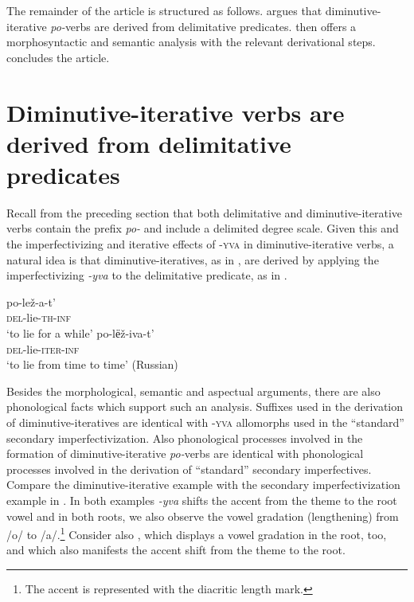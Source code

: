 \documentclass[output=paper,colorlinks,citecolor=brown]{langscibook}
\begin{document}
The remainder of the article is structured as follows.  argues that diminutive-iterative \textit{po-}verbs are derived from delimitative predicates.  then offers a morphosyntactic and semantic analysis with the relevant derivational steps.  concludes the article.

\section{Diminutive-iterative verbs are derived from delimitative predicates} \label{biskup:sec:dimin-iter}

Recall from the preceding section that both delimitative and diminutive-iterative verbs contain the prefix \textit{po-} and include a delimited degree scale. Given this and the imperfectivizing and iterative effects of \textsc{-yva} in diminutive-iterative verbs, a natural idea is that diminutive-iteratives, as in , are derived by applying the imperfectivizing \textit{-yva} to the delimitative predicate, as in . 

\ea\label{biskup:ex:dimin-rus}\ea\gll po-lež-a-t' \\
\textsc{del}-lie-\textsc{th-inf}\\
\glt ‘to lie for a while’ \label{biskup:ex:dimin-rus.a}
\ex\gll po-lёž-iva-t'\\
\textsc{del}-lie-\textsc{iter-inf}\\
\glt ‘to lie from time to time’ \hfill (Russian)\label{biskup:ex:dimin-rus.b}
\z\z

\noindent Besides the morphological, semantic and aspectual arguments, there are also phonological facts which support such an analysis. Suffixes used in the derivation of diminutive-iteratives are identical with \textsc{-yva} allomorphs used in the “standard” secondary imperfectivization. Also phonological processes involved in the formation of diminutive-iterative \textit{po-}verbs are identical with phonological processes involved in the derivation of “standard” secondary imperfectives. Compare the diminutive-iterative example  with the secondary imperfectivization example in . In both examples \textit{-yva} shifts the accent from the theme to the root vowel and in both roots, we also observe the vowel gradation (lengthening) from /o/ to /a/.\footnote{The accent is represented with the diacritic length mark.}  Consider also , which displays a vowel gradation in the root, too, and which also manifests the accent shift from the theme to the root.
\end{document}
